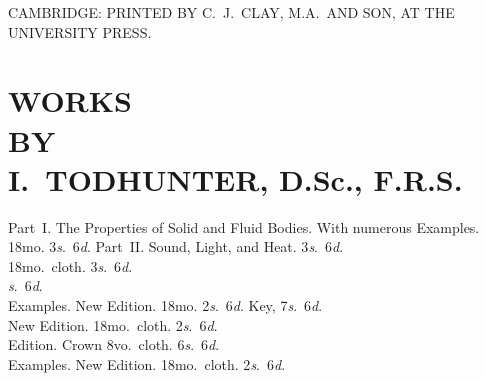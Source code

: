 \documentclass{book}[2004/02/16]
\begin{document}
\vfill
\begin{center}
\noindent\hrulefill\nopagebreak\par
\scriptsize
CAMBRIDGE: PRINTED BY C.~J.\ CLAY, M.A.\ AND SON, AT THE UNIVERSITY PRESS.
\end{center}


\chapter*{\centering\Large
WORKS\\
{\footnotesize BY}\\
\textbf{I.\ TODHUNTER, D.Sc., F.R.S.}
}

\noindent\hangindent\parindent{\LARGE Natural Philosophy for Beginners. In two parts.}
\linebreak
Part~I\@. The Properties of Solid and Fluid Bodies. With numerous
Examples. 18mo. 3\textit{s}.\ 6\textit{d}. Part~II\@. Sound, Light, and Heat. 3\textit{s}.\ 6\textit{d}.\\[.5ex]

\noindent\hangindent\parindent{\LARGE Euclid for Colleges and Schools. New Edition.}
\linebreak
18mo.\ cloth. 3\textit{s}.\ 6\textit{d}.\\[.5ex]

\noindent\hangindent\parindent{\LARGE Key to Exercises in Euclid. Crown 8vo.\ cloth.}
\textit{s}.\ 6\textit{d}.\\[.5ex]

\noindent\hangindent\parindent{\LARGE Mensuration for Beginners. With numerous}
\linebreak
Examples. New Edition. 18mo. 2\textit{s}.\ 6\textit{d}. Key, 7\textit{s}.\ 6\textit{d}.\\[.5ex]

\noindent\hangindent\parindent{\LARGE Algebra for Beginners. With numerous Examples.}
\linebreak
New Edition. 18mo.\ cloth. 2\textit{s}.\ 6\textit{d}.\\[.5ex]

\noindent\hangindent\parindent{\LARGE Key to the Algebra for Beginners. New}
\linebreak
Edition. Crown 8vo.\ cloth. 6\textit{s}.\ 6\textit{d}.\\[.5ex]

\noindent\hangindent\parindent{\LARGE Trigonometry for Beginners. With numerous}
\linebreak
Examples. New Edition. 18mo.\ cloth. 2\textit{s}.\ 6\textit{d}.\\[.5ex]
\end{document}
